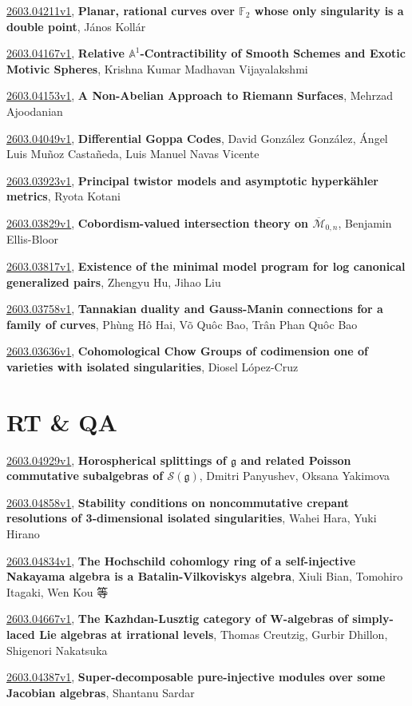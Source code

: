 \documentclass[9pt, a4paper]{article}
\theoremstyle{plain}
\theoremstyle{definition}
\theoremstyle{remark}
\newcommand{\arxiv}[3]{\href{https://arxiv.org/abs/#1}{#1}, \textbf{\textcolor{arxivblue}{#2}}, #3}
\begin{document}
\arxiv{2603.04211v1}{Planar, rational curves over ${\mathbb F}_2$ whose only singularity is a double point}{János Kollár}

\arxiv{2603.04167v1}{Relative $\mathbb{A}^1$-Contractibility of Smooth Schemes and Exotic Motivic Spheres}{Krishna Kumar Madhavan Vijayalakshmi}

\arxiv{2603.04153v1}{A Non-Abelian Approach to Riemann Surfaces}{Mehrzad Ajoodanian}

\arxiv{2603.04049v1}{Differential Goppa Codes}{David González González, Ángel Luis Muñoz Castañeda, Luis Manuel Navas Vicente}

\arxiv{2603.03923v1}{Principal twistor models and asymptotic hyperkähler metrics}{Ryota Kotani}

\arxiv{2603.03829v1}{Cobordism-valued intersection theory on $\overline{\mathcal{M}}_{0,n}$}{Benjamin Ellis-Bloor}

\arxiv{2603.03817v1}{Existence of the minimal model program for log canonical generalized pairs}{Zhengyu Hu, Jihao Liu}

\arxiv{2603.03758v1}{Tannakian duality and Gauss-Manin connections for a family of curves}{Phùng Hô Hai, Võ Quôc Bao, Trân Phan Quôc Bao}

\arxiv{2603.03636v1}{Cohomological Chow Groups of codimension one of varieties with isolated singularities}{Diosel López-Cruz}


\section{RT \& QA}
\arxiv{2603.04929v1}{Horospherical splittings of $\mathfrak g$ and related Poisson commutative subalgebras of $\mathcal S(\mathfrak g)$}{Dmitri Panyushev, Oksana Yakimova}

\arxiv{2603.04858v1}{Stability conditions on noncommutative crepant resolutions of 3-dimensional isolated singularities}{Wahei Hara, Yuki Hirano}

\arxiv{2603.04834v1}{The Hochschild cohomlogy ring of a self-injective Nakayama algebra is a Batalin-Vilkoviskys algebra}{Xiuli Bian, Tomohiro Itagaki, Wen Kou 等}

\arxiv{2603.04667v1}{The Kazhdan-Lusztig category of W-algebras of simply-laced Lie algebras at irrational levels}{Thomas Creutzig, Gurbir Dhillon, Shigenori Nakatsuka}

\arxiv{2603.04387v1}{Super-decomposable pure-injective modules over some Jacobian algebras}{Shantanu Sardar}
\end{document}
